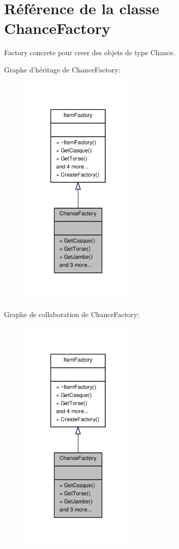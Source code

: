 \hypertarget{class_chance_factory}{\section{Référence de la classe Chance\-Factory}
\label{class_chance_factory}
}


Factory concrete pour creer des objets de type Chance.  




Graphe d'héritage de Chance\-Factory\-:
\nopagebreak
\begin{figure}[H]
\begin{center}
\leavevmode
\includegraphics[width=160pt]{class_chance_factory__inherit__graph}
\end{center}
\end{figure}


Graphe de collaboration de Chance\-Factory\-:
\nopagebreak
\begin{figure}[H]
\begin{center}
\leavevmode
\includegraphics[width=160pt]{class_chance_factory__coll__graph}
\end{center}
\end{figure}
